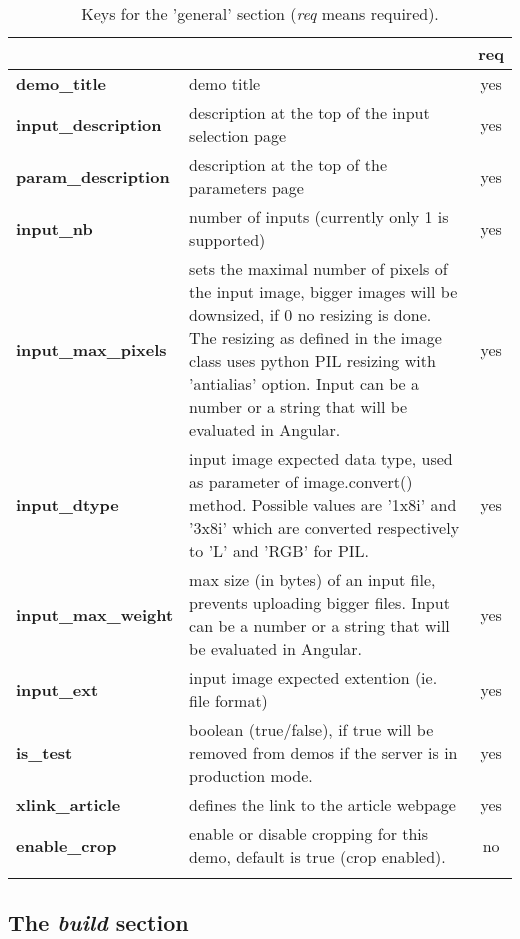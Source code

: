 \begin{longtable}{|>{\bf}L{\linewidth}|L{\linewidth}|c|}
\hline
      &  & {\bf req} 
\tabularnewline \hline \hline
 demo\_title         & demo title & yes\\ \hline
 input\_description  & description at the top of the input selection page 
                     & yes \\ \hline
 param\_description  & description at the top of the para\-meters page & yes
                      \\ \hline
 input\_nb           & number of inputs (currently only 1 is supported) & yes\\ 
\hline
 input\_max\_pixels & sets the maximal number of pixels of the input image, 
bigger images will be downsized, if 0 no resizing is done. The resizing as 
defined in the image class uses python PIL resizing with 'antialias' option. 
Input can be a number or a string that will be evaluated in Angular. & 
yes  \\ \hline
 input\_dtype       & input image expected data type, used as parameter of 
image.convert() method. Possible values are '1x8i' and '3x8i' which are 
converted respectively to 'L' and 'RGB' for PIL.& yes  \\ \hline
 input\_max\_weight & max size (in bytes) of an input file, prevents uploading 
bigger files. Input can be a number or a string that will be evaluated in Angular.
                    & yes  \\ \hline
 input\_ext         & input image expected extention (ie. file format) & yes  
\\ \hline
 is\_test           & boolean (true/false), if true will be removed from demos 
if the server is in production mode.& yes  \\ \hline
 xlink\_article     & defines the link to the article webpage & yes  \\ \hline
 enable\_crop       & enable or disable cropping for this demo, default is true 
                      (crop enabled). & no   \\ \hline
\caption{Keys for the 'general' section ({\em req} means required).}
\end{longtable}

\subsection{The \emph{build} section}

